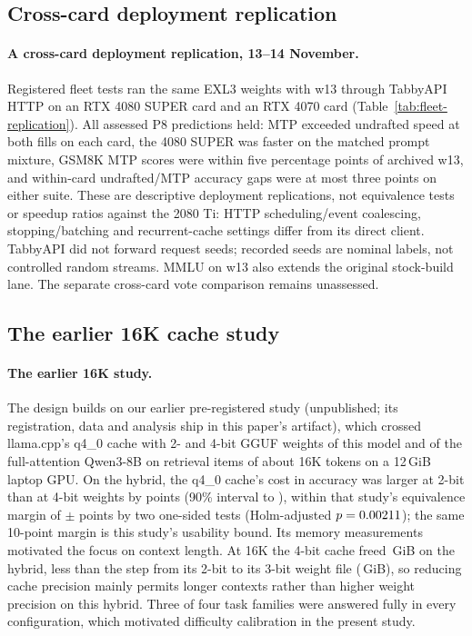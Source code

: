 \documentclass[11pt,letterpaper]{article}
\begin{document}
\subsection{Cross-card deployment replication}
\label{app:fleet}
\paragraph{A cross-card deployment replication, 13--14 November.}
Registered fleet tests ran the same EXL3 weights with w13 through TabbyAPI
HTTP on an RTX 4080 SUPER card and an RTX 4070 card
(Table~\ref{tab:fleet-replication}). All \PeFleetAssessedPredictions{} assessed
P8 predictions held: MTP exceeded undrafted speed at both fills on each card,
the 4080 SUPER was faster on the matched prompt mixture, GSM8K MTP scores
were within five percentage points of archived w13, and within-card
undrafted/MTP accuracy gaps were at most three points on either suite.
These are descriptive deployment replications, not equivalence tests or
speedup ratios against the 2080 Ti: HTTP scheduling/event coalescing,
stopping/batching and recurrent-cache settings differ from its direct client.
TabbyAPI did not forward request seeds; recorded seeds are nominal labels,
not controlled random streams. MMLU on w13 also extends the original
stock-build lane. The separate cross-card vote comparison remains unassessed.




\subsection{The earlier 16K cache study}
\paragraph{The earlier 16K study.}
\label{sec:p6}
The design builds on our earlier pre-registered study (unpublished; its
registration, data and analysis ship in this paper's artifact), which crossed
llama.cpp's q4\_0 cache with 2- and 4-bit GGUF weights of this model and of
the full-attention Qwen3-8B \citep{qwen2025qwen3} on \PeSixItems{} retrieval
items of about 16K tokens on a 12\,GiB laptop GPU. On the hybrid, the q4\_0
cache's cost in accuracy was larger at 2-bit than at 4-bit weights by
\PeSixI{} points (90\% interval \PeSixILo{} to \PeSixIHi), within that
study's equivalence margin of $\pm$\PeSixMargin{} points by two one-sided
tests (Holm-adjusted $p=0.00211$); the same 10-point margin is this
study's usability bound. Its memory measurements motivated the focus on context
length. At 16K the 4-bit cache freed \PeSixFreedHyb\,GiB on the hybrid, less
than the step from its 2-bit to its 3-bit weight file (\PeSixStepHyb\,GiB),
so reducing cache precision mainly permits longer contexts rather than
higher weight precision on this hybrid. Three of four task families were
answered fully in every configuration, which motivated difficulty
calibration in the present study.
\end{document}
